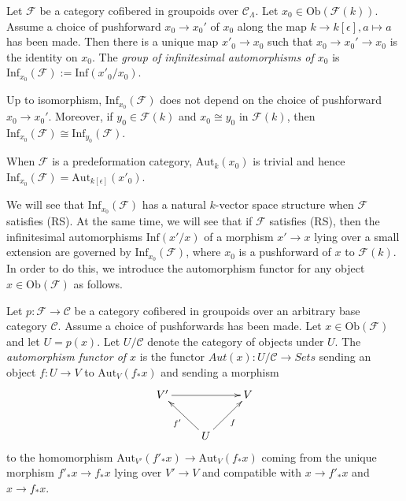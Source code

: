 \begin{definition}
\label{definition-infinitesimal-auts}
Let $\mathcal{F}$ be a category cofibered in groupoids over $\mathcal 
C_\Lambda$. Let $x_0 \in \text{Ob}(\mathcal{F}(k))$. Assume a choice of 
pushforward $x_0 \to x_0'$ of $x_0$ along the map
$k \to k[\epsilon], a \mapsto a$ has been made.
Then there is a unique map $x'_0 \to x_0$ such that
$x_0 \to x_0' \to x_0$ is the identity on $x_0$. 
The {\it group of infinitesimal automorphisms of $x_0$}
is $\text{Inf}_{x_0}(\mathcal F) := \text{Inf}(x'_0/x_0)$.
\end{definition}

\begin{remark}
\label{remark-choice-pushforward-immaterial-infinitesimal-aut}
Up to isomorphism, $\text{Inf}_{x_0}(\mathcal{F})$ does not depend on the 
choice of pushforward $x_0 \to x_0'$.  Moreover, if $y_0 \in \mathcal 
F(k)$ and $x_0 \cong y_0$ in $\mathcal{F}(k)$, then 
$\text{Inf}_{x_0}(\mathcal{F}) \cong \text{Inf}_{y_0}(\mathcal{F})$.
\end{remark}

\begin{remark}
\label{remark-trivial-aut-point}
When $\mathcal{F}$ is a predeformation category, $\text{Aut}_{k}(x_0)$ is 
trivial and hence $\text{Inf}_{x_0}(\mathcal{F}) = 
\text{Aut}_{k[\epsilon]}(x'_0)$.
\end{remark}

\noindent
We will see that $\text{Inf}_{x_0}(\mathcal{F})$ has a natural $k$-vector 
space structure when $\mathcal{F}$ satisfies (RS). At the same time, we will
see that if $\mathcal{F}$ satisfies (RS), then the infinitesimal automorphisms
$\text{Inf}(x'/x)$ of a morphism $x' \to x$ lying over a small
extension are governed by $\text{Inf}_{x_0}(\mathcal{F})$, where $x_0$ is
a pushforward of $x$ to $\mathcal{F}(k)$. In order to do this, we introduce
the automorphism functor for any object $x \in \text{Ob}(\mathcal{F})$ as
follows.

\begin{definition}
\label{definition-automorphism-functor}
Let $p : \mathcal{F} \to \mathcal{C}$ be a category cofibered in groupoids
over an arbitrary base category $\mathcal{C}$. Assume a choice of pushforwards
has been made. Let $x \in \text{Ob}(\mathcal{F})$ and let $U = p(x)$.
Let $U/\mathcal{C}$ denote the category of objects under $U$. The
{\it automorphism functor of $x$} is the functor
$\mathit{Aut}(x) : U/\mathcal{C} \to \textit{Sets}$ sending an object
$f : U \to V$ to $\text{Aut}_V(f_*x)$ and sending a morphism
$$
\xymatrix{
V' \ar[rr] &                    & V\\
          & U \ar[ul]^{f'}  \ar[ur]_f & 
}
$$
to the homomorphism
$\text{Aut}_{V'}(f'_*x) \to \text{Aut}_{V}(f_*x)$
coming from the unique morphism $f'_*x \to f_*x$ lying over
$V' \to V$ and compatible with $x \to f'_*x$ and $x \to f_*x$.
\end{definition}

